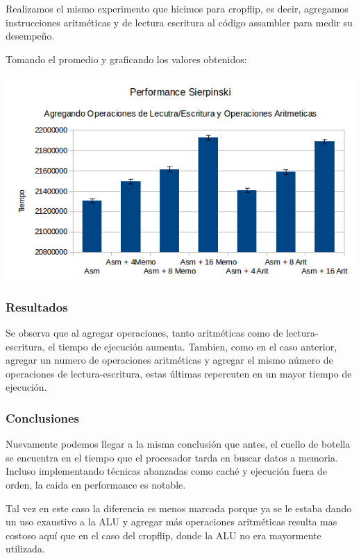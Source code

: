 \documentclass[a4paper]{article}
\begin{document}
Realizamos el mismo experimento que hicimos para cropflip, es decir, agregamos instrucciones aritméticas y de lectura escritura al código assambler para medir su desempeño.

Tomando el promedio y graficando los valores obtenidos:

  \begin{center}
  \includegraphics[scale=0.66]{Graficos1.5/sie/per.png}
  \end{center}

\subsubsection{Resultados}
Se observa que al agregar operaciones, tanto aritméticas como de lectura-escritura, el tiempo de ejecución aumenta. Tambien, como en el caso anterior, agregar un numero de operaciones aritméticas y agregar el mismo número de operaciones de lectura-escritura, estas últimas repercuten en un mayor tiempo de ejecución.

\subsubsection{Conclusiones}

Nuevamente podemos llegar a la misma conclusión que antes, el cuello de botella se encuentra en el tiempo que el procesador tarda en buscar datos a memoria. Incluso implementando técnicas abanzadas como caché y ejecución fuera de orden, la caida en performance es notable.

Tal vez en este caso la diferencia es menos marcada porque ya se le estaba dando un uso exaustivo a la ALU y agregar más operaciones aritméticas resulta mas costoso aquí que en el caso del cropflip, donde la ALU no era mayormente utilizada.
\end{document}
